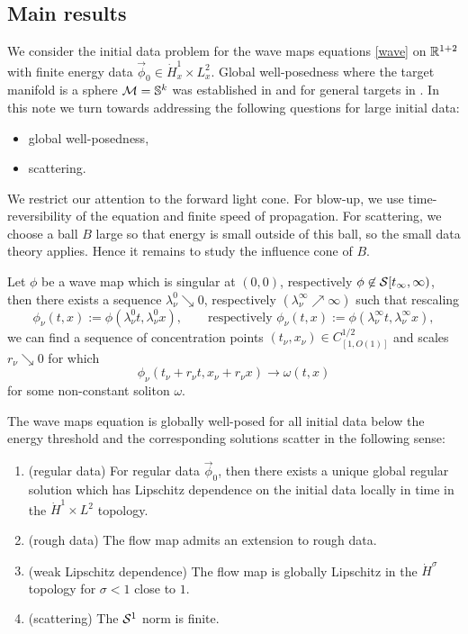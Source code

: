 \subsection{Main results}

We consider the initial data problem for the wave maps equations \eqref{wave} on $\mathbb R^{1 + 2}$ with finite energy data $\vec \phi_0 \in \dot H^1_x \times L^2_x$. Global well-posedness where the target manifold is a sphere $\mathcal M = \mathbb S^k$ was established in \cite{Tao2001} and for general targets in \cite{Tataru2005}. In this note we turn towards addressing the following questions for large initial data:
	\begin{itemize}
		\item global well-posedness, 
		\item scattering.
	\end{itemize}
We restrict our attention to the forward light cone. For blow-up, we use time-reversibility of the equation and finite speed of propagation. For scattering, we choose a ball $B$ large so that energy is small outside of this ball, so the small data theory applies. Hence it remains to study the influence cone of $B$. 


\begin{theorem}
	Let $\phi$ be a wave map which is singular at $(0, 0)$, respectively $\phi \not\in \mathcal S [t_\infty, \infty)$, then there exists a sequence $\lambda^0_\nu \searrow 0$, respectively $(\lambda^\infty_\nu \nearrow \infty)$ such that rescaling 
		\[ \phi_\nu (t, x) := \phi(\lambda^0_\nu t, \lambda^0_\nu x), \qquad \text{respectively }  \phi_\nu (t, x) := \phi(\lambda^\infty_\nu t, \lambda^\infty_\nu x),\]
	we can find a sequence of concentration points $(t_\nu, x_\nu) \in C^{1/2}_{[1, O(1)]}$ and scales $r_\nu \searrow 0$ for which
		\[ \phi_\nu (t_\nu + r_\nu t, x_\nu + r_\nu x) \to \omega (t, x) \]
	for some non-constant soliton $\omega$. 
\end{theorem}

\begin{theorem}
	The wave maps equation is globally well-posed for all initial data below the energy threshold and the corresponding solutions scatter in the following sense:
	\begin{enumerate}
		\item (regular data) For regular data $\vec \phi_0$, then there exists a unique global regular solution which has Lipschitz dependence on the initial data locally in time in the $\dot H^1 \times L^2$ topology. 
		
		\item (rough data) The flow map admits an extension to rough data. 
		
		\item (weak Lipschitz dependence) The flow map is globally Lipschitz in the $\dot H^{\sigma}$ topology for $\sigma < 1$ close to $1$. 
		
		\item (scattering) The $\mathcal S^1$ norm is finite.
	\end{enumerate}	
\end{theorem}

